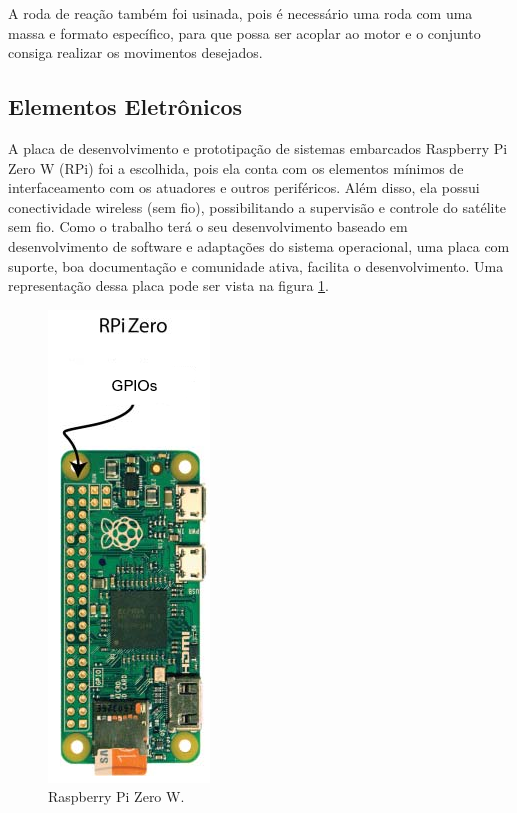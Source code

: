 A roda de reação também foi usinada, pois é necessário uma roda com uma massa e formato específico, para que possa ser acoplar ao motor e o conjunto consiga realizar os movimentos desejados. 



\subsection{Elementos Eletrônicos}

A placa de desenvolvimento e prototipação de sistemas embarcados Raspberry Pi Zero W (RPi) foi a escolhida, pois ela conta com os elementos mínimos de interfaceamento com os atuadores e outros periféricos. Além disso, ela possui conectividade wireless (sem fio), possibilitando a supervisão e controle do satélite sem fio. Como o trabalho terá o seu desenvolvimento baseado em desenvolvimento de software e adaptações do sistema operacional, uma placa com suporte, boa documentação e comunidade ativa, facilita o desenvolvimento. Uma representação dessa placa pode ser vista na figura \ref{fig:rasp_zero}.

\begin{figure}[H]
  \caption{Raspberry Pi Zero W.}
  \begin{center}
      \includegraphics[scale=.55]{metodologia/img/rasp_zero}
  \end{center}
  \label{fig:rasp_zero}
\end{figure}

